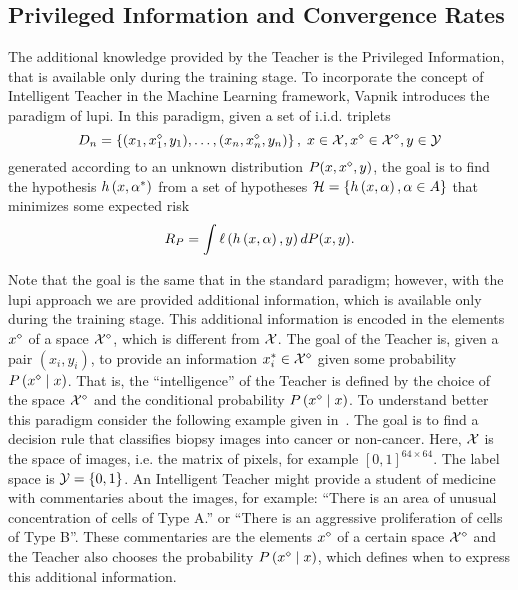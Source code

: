 \subsection{Privileged Information and Convergence Rates}
The additional knowledge provided by the Teacher is the Privileged Information, that is available only during the training stage.
To incorporate the concept of Intelligent Teacher in the Machine Learning framework, Vapnik introduces the paradigm of \acrshort{lupi}.
In this paradigm, given a set of i.i.d. triplets
$$ D_n = \left\{(x_1, {x}^{\diamond}_1, y_1), \ldots, (x_n,{x}^{\diamond}_n, y_n)\right\}, \; x \in \mathcal{X}, {x}^{\diamond} \in {\mathcal{X}}^{\diamond}, y \in \mathcal{Y} $$
generated according to an unknown distribution $P(x, {x}^{\diamond}, y)$, the goal is to find the hypothesis $h\left(x, {\alpha}^*\right)$ from a set of hypotheses $\mathcal{H} = \left\{h\left(x, \alpha\right), \alpha \in A\right\}$ that minimizes some expected risk 
$$ R_P = \int \ell\left( h\left(x, \alpha\right), y\right) dP(x, y). $$

Note that the goal is the same that in the standard paradigm; however, with the \acrshort{lupi} approach we are provided additional information, which is available only during the training stage. This additional information is encoded in the elements ${x}^{\diamond}$ of a space ${\mathcal{X}}^{\diamond}$, which is different from $\mathcal{X}$. The goal of the Teacher is, given a pair $(x_i, y_i)$, to provide an information $x_i^* \in {\mathcal{X}}^{\diamond}$ given some probability $P\left( {x}^{\diamond} \;\middle\vert\; x \right)$. That is, the ``intelligence'' of the Teacher is defined by the choice of the space ${\mathcal{X}}^{\diamond}$ and the conditional probability $P\left( {x}^{\diamond} \;\middle\vert\; x \right)$. 
To understand better this paradigm consider the following example given in~\cite{VapnikI15a}.
 The goal is to find a decision rule that classifies biopsy images into cancer or non-cancer. Here, $\mathcal{X}$ is the space of images, i.e. the matrix of pixels, for example $[0, 1]^{64 \times 64}$. The label space is $\mathcal{Y} = \left\{0, 1\right\}$. An Intelligent Teacher might provide a student of medicine with commentaries about the images, for example: ``There is an area of unusual concentration of cells of Type A.'' or ``There is an aggressive proliferation of cells of Type B''. These commentaries are the elements ${x}^{\diamond}$ of a certain space ${\mathcal{X}}^{\diamond}$ and the Teacher also chooses the probability $P\left( {x}^{\diamond} \;\middle\vert\; x \right)$, which defines when to express this additional information.


